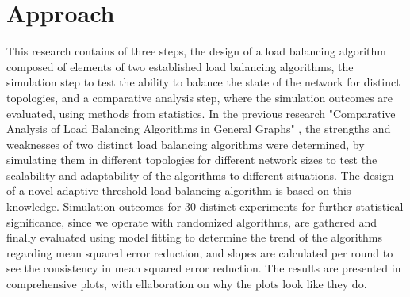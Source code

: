 \section{Approach}\label{sec:approach}
This research contains of three steps, the design of a load balancing algorithm composed of elements of two established load balancing algorithms, the simulation step to test the ability to balance the state of the network for distinct topologies, and a comparative analysis step, where the simulation outcomes are evaluated, using methods from statistics. In the previous research "Comparative Analysis of Load Balancing Algorithms in General Graphs" \cite{Bayazitoglu}, the strengths and weaknesses of two distinct load balancing algorithms were determined, by simulating them in different topologies for different network sizes to test the scalability and adaptability of the algorithms to different situations. The design of a novel adaptive threshold load balancing algorithm is based on this knowledge. Simulation outcomes for 30 distinct experiments for further statistical significance, since we operate with randomized algorithms, are gathered and finally evaluated using model fitting to determine the trend of the algorithms regarding mean squared error reduction, and slopes are calculated per round to see the consistency in mean squared error reduction. The results are presented in comprehensive plots, with ellaboration on why the plots look like they do.
